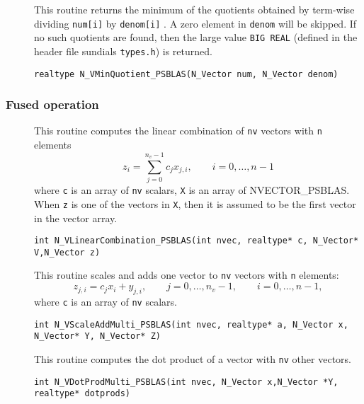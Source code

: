 \documentclass[twoside,a4paper]{refart}
\begin{document}
\begin{description}
 	\item[] This routine returns the minimum of the quotients obtained by term-wise
 	dividing \lstinline[style=CStyle]|num[i]| by \lstinline[style=CStyle]|denom[i]| . A zero element in \lstinline[style=CStyle]|denom| will be skipped. If no
 	such quotients are found, then the large value \lstinline[style=CStyle]|BIG REAL| (defined in the
 	header file sundials \texttt{types.h}) is returned.
 	
 	 \lstinline[style=CStyle]|realtype N_VMinQuotient_PSBLAS(N_Vector num, N_Vector denom)|
 	
\end{description}

\subsubsection{Fused operation}
\begin{description}
 	\item[] This routine computes the linear combination of \lstinline[style=CStyle]|nv| vectors with \lstinline[style=CStyle]|n| elements
 	\begin{equation*}
 		z_i = \sum_{j=0}^{n_v - 1} c_j x_{j,i}, \qquad i=0,\ldots,n-1
 	\end{equation*}
 	where \lstinline[style=CStyle]|c| is an array of \lstinline[style=CStyle]|nv| scalars, \lstinline[style=CStyle]|X| is an array of NVECTOR\_PSBLAS. When \lstinline[style=CStyle]|z| is one of the vectors in \lstinline[style=CStyle]|X|, then it is assumed to be the first vector in the vector array.
 	
 	 \lstinline[style=CStyle]|int N_VLinearCombination_PSBLAS(int nvec, realtype* c, N_Vector* V,N_Vector z)|
 	
 	\item[] This routine scales and adds one vector to \lstinline[style=CStyle]|nv| vectors with \lstinline[style=CStyle]|n| elements:
 	\begin{equation*}
 		z_{j,i} = c_j x_i + y_{j,i}, \qquad j=0,\ldots,n_v-1, \qquad i=0,\ldots,n-1,
 	\end{equation*}
 	where \lstinline[style=CStyle]|c| is an array of \lstinline[style=CStyle]|nv| scalars.
 	
 	 \lstinline[style=CStyle]|int N_VScaleAddMulti_PSBLAS(int nvec, realtype* a, N_Vector x, N_Vector* Y, N_Vector* Z)|
 	
 	\item[] This routine computes the dot product of a vector with \lstinline[style=CStyle]|nv| other vectors.
 	
 	 \lstinline[style=CStyle]|int N_VDotProdMulti_PSBLAS(int nvec, N_Vector x,N_Vector *Y, realtype* dotprods)|
 \end{description}
\end{document}
